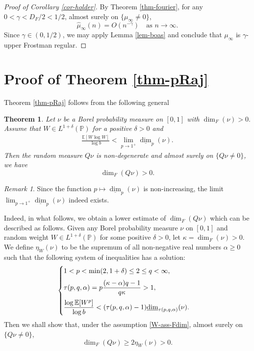 \documentclass[12pt]{amsart}
\newtheorem{theorem}{Theorem}[section]
\theoremstyle{definition}
\theoremstyle{remark}
\newtheorem*{remark*}{Remark}
\newcommand{\E}{\mathbb{E}}
\newcommand{\PP}{\mathbb{P}}
\newcommand{\ldim}{\underline{\dim}}
\numberwithin{equation}{section}
\begin{document}
\begin{proof}[Proof of Corollary \ref{cor-holder}]
By Theorem \ref{thm-fourier},  for any $0< \gamma< D_F/2 < 1/2$, almost surely on $\{\mu_\infty \ne 0\}$, 
\[
\widehat{\mu}_\infty(n) = O (n^{- \gamma}) \quad \text{as $n\to\infty$}. 
\]
Since $\gamma  \in (0, 1/2)$, we may apply Lemma \ref{lem-boas} and conclude that $\mu_\infty$ is $\gamma$-upper Frostman regular. 
\end{proof}



















\section{Proof of Theorem \ref{thm-pRaj}}\label{sec-con-2}


Theorem \ref{thm-pRaj} follows  from  the following general 
\begin{theorem}\label{thm-preFdim}
Let $\nu$ be a  Borel probability measure on $[0,1]$ with 
$
\dim_F(\nu)>0.
$
Assume that $W\in L^{1+\delta}(\PP)$ for a positive $\delta>0$ and 
\begin{align}\label{W-ass-Fdim}
 \frac{\E[W\log W]}{\log b} < \lim_{p\to 1^{+}} \ldim_{p}(\nu). 
 \end{align}
 Then the random  measure  $Q\nu$ is non-degenerate and   almost surely on $\{Q\nu\ne 0\}$, we have 
 \[
 \dim_F(Q\nu) > 0.
 \]
\end{theorem}

\begin{remark*}
Since the function $p\mapsto \ldim_p(\nu)$ is non-increasing, the limit $ \lim_{p\to 1^{+}} \ldim_{p}(\nu)$ indeed exists. 
\end{remark*}




Indeed, in what follows,  we obtain a lower estimate of $\dim_F(Q\nu)$ which can be described as follows. 
Given any Borel probability measure $\nu$ on $[0,1]$ and random weight $W\in L^{1+\delta}(\PP)$ for some positive $\delta>0$, let $\kappa=\dim_F(\nu)>0$. We define $\eta_W(\nu)$ to be the supremum of all non-negative real numbers $\alpha\ge 0$ such that the following system  of inequalities has a solution: 
\[
\begin{cases}
1<p< \min(2, 1 + \delta)\le     2\le q<\infty,
\vspace{2mm}
\\
\displaystyle \tau(p, q, \alpha) = p \frac{(\kappa-\alpha)q - 1}{q \kappa}>1,
\vspace{2mm}
\\
\displaystyle\frac{\log \E[W^p]}{\log b}  < (\tau(p, q, \alpha)- 1) \ldim_{\tau(p, q, \alpha)}(\nu).
\end{cases}
\]
Then we shall show that, under the assumption \eqref{W-ass-Fdim},   almost surely on $\{Q\nu\ne 0\}$, 
\[
\dim_F(Q\nu)\ge   2 \eta_W(\nu) > 0. 
\]
\end{document}

